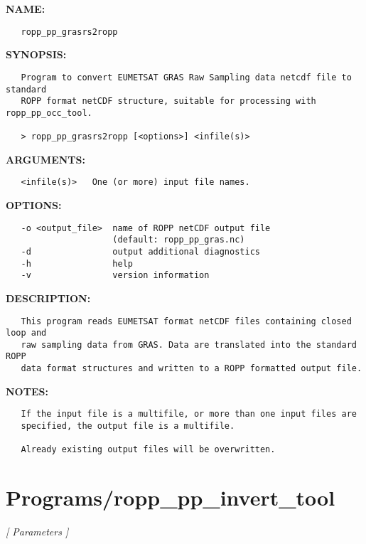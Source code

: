 \label{ch:robo88}
\label{ch:Programs_ropp_pp_grasrs2ropp}
\textbf{NAME:}\hspace{0.08in}\begin{Verbatim}
   ropp_pp_grasrs2ropp
\end{Verbatim}
\textbf{SYNOPSIS:}\hspace{0.08in}\begin{Verbatim}
   Program to convert EUMETSAT GRAS Raw Sampling data netcdf file to standard
   ROPP format netCDF structure, suitable for processing with ropp_pp_occ_tool.

   > ropp_pp_grasrs2ropp [<options>] <infile(s)>
\end{Verbatim}
\textbf{ARGUMENTS:}\hspace{0.08in}\begin{Verbatim}
   <infile(s)>   One (or more) input file names.
\end{Verbatim}
\textbf{OPTIONS:}\hspace{0.08in}\begin{Verbatim}
   -o <output_file>  name of ROPP netCDF output file
                     (default: ropp_pp_gras.nc)
   -d                output additional diagnostics
   -h                help
   -v                version information
\end{Verbatim}
\textbf{DESCRIPTION:}\hspace{0.08in}\begin{Verbatim}
   This program reads EUMETSAT format netCDF files containing closed loop and
   raw sampling data from GRAS. Data are translated into the standard ROPP
   data format structures and written to a ROPP formatted output file.
\end{Verbatim}
\textbf{NOTES:}\hspace{0.08in}\begin{Verbatim}
   If the input file is a multifile, or more than one input files are
   specified, the output file is a multifile.

   Already existing output files will be overwritten.
\end{Verbatim}
\section{Programs/ropp\_pp\_invert\_tool}
\textsl{[ Parameters ]}

